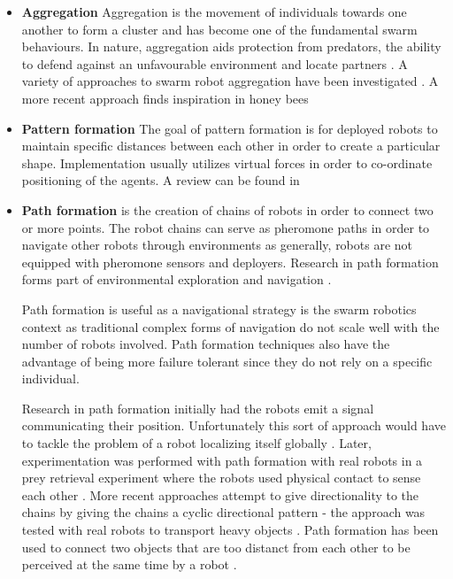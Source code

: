 \begin{itemize}
	\item \textbf{Aggregation} Aggregation is the movement of individuals towards one another to form a cluster and has become one of the fundamental swarm behaviours. In nature, aggregation aids protection from predators, the ability to defend against an unfavourable environment and locate partners \cite{bonabeau2001self}. A variety of approaches to swarm robot aggregation have been investigated \cite{yan2011algorithm, soysal2007aggregation, trianni2003evolving, dimarogonas2008connectedness }. A more recent approach finds inspiration in honey bees \cite{schmickl2011beeclust, schmickl2009two}
	
	\item \textbf{Pattern formation}
	The goal of pattern formation is for deployed robots to maintain specific distances between each other in order to create a particular shape. Implementation usually utilizes virtual forces in order to co-ordinate positioning of the agents. A review can be found in \cite{bahceci2003review, hettiarachchi2009review}
	
	\item \textbf{Path formation} is the creation of chains of robots in order to connect two or more points. The robot chains can serve as pheromone paths in order to navigate other robots through environments as generally, robots are not equipped with pheromone sensors and deployers. Research in path formation forms part of environmental exploration and navigation \cite{nouyan2006chain}. 
	
	Path formation is useful as a navigational strategy is the swarm robotics context as traditional complex forms of navigation do not scale well with the number of robots involved. Path formation techniques also have the advantage of being more failure tolerant since they do not rely on a specific individual.
	
	Research in path formation initially had the robots emit a signal communicating their position. Unfortunately this sort of approach would have to tackle the problem of a robot localizing itself globally \cite{goss1992harvesting}. Later, experimentation was performed with path formation with real robots in a prey retrieval experiment where the robots used physical contact to sense each other \cite{werger1996robotic}. More recent approaches attempt to give directionality to the chains by giving the chains a cyclic directional pattern - the approach was tested with real robots to transport heavy objects \cite{nouyan2006group}. Path formation has been used to connect two objects that are too distanct from each other to be perceived at the same time by a robot \cite{nouyan2006chain}.


\end{itemize}
